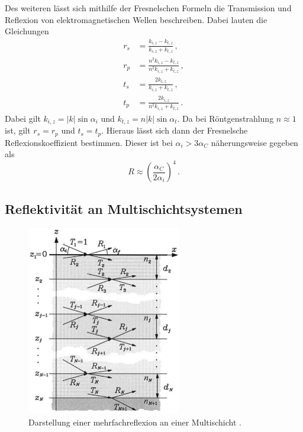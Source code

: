 Des weiteren lässt sich mithilfe der Fresnelschen Formeln die Transmission und Reflexion von elektromagnetischen Wellen beschreiben.
Dabei lauten die Gleichungen
\begin{align*}
    r_s & =\frac{k_{i,z} - k_{t,z}}{k_{i,z} + k_{t,z}} \, ,\\
    r_p & =\frac{n^2 k_{i,z} - k_{t,z}}{n^2 k_{i,z} + k_{t,z}} \, ,\\
    t_s & =\frac{2 k_{i,z}}{k_{i,z} + k_{t,z}} \, ,\\
    t_p & =\frac{2 k_{i,z}}{n^2 k_{i,z} + k_{t,z}} \, .
\end{align*}
Dabei gilt $k_{i,z} = |k| \sin \alpha_i$ und $k_{t,z} = n |k| \sin \alpha_t$.
Da bei Röntgenstrahlung $n \approx 1$ ist, gilt $r_s = r_p$ und $t_s = t_p$.
Hieraus lässt sich dann der Fresnelsche Reflexionskoeffizient bestimmen.
Dieser ist bei $\alpha_i > 3 \alpha_C$ näherungsweise gegeben als \cite{tolan_xray}
\begin{equation}
    R\approx \left( \frac{\alpha_C}{2 \alpha_i} \right)^4 \, .
\end{equation}

\subsection{Reflektivität an Multischichtsystemen}
\begin{figure}
    \centering
    \includegraphics[width=0.6\textwidth]{pictures/multischicht.pdf}
    \caption{Darstellung einer mehrfachreflexion an einer Multischicht \cite{tolan_xray}.}
    \label{fig:multischicht}
\end{figure}